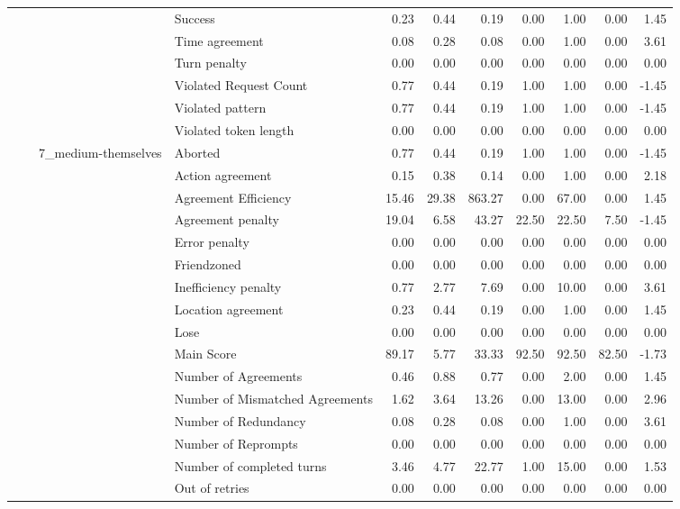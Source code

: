 \begin{tabular}{llllrrrrrrr}
 &  &  & Success & 0.23 & 0.44 & 0.19 & 0.00 & 1.00 & 0.00 & 1.45 \\
 &  &  & Time agreement & 0.08 & 0.28 & 0.08 & 0.00 & 1.00 & 0.00 & 3.61 \\
 &  &  & Turn penalty & 0.00 & 0.00 & 0.00 & 0.00 & 0.00 & 0.00 & 0.00 \\
 &  &  & Violated Request Count & 0.77 & 0.44 & 0.19 & 1.00 & 1.00 & 0.00 & -1.45 \\
 &  &  & Violated pattern & 0.77 & 0.44 & 0.19 & 1.00 & 1.00 & 0.00 & -1.45 \\
 &  &  & Violated token length & 0.00 & 0.00 & 0.00 & 0.00 & 0.00 & 0.00 & 0.00 \\
\cline{3-11}
 &  & \multirow[t]{27}{*}{7_medium-themselves} & Aborted & 0.77 & 0.44 & 0.19 & 1.00 & 1.00 & 0.00 & -1.45 \\
 &  &  & Action agreement & 0.15 & 0.38 & 0.14 & 0.00 & 1.00 & 0.00 & 2.18 \\
 &  &  & Agreement Efficiency & 15.46 & 29.38 & 863.27 & 0.00 & 67.00 & 0.00 & 1.45 \\
 &  &  & Agreement penalty & 19.04 & 6.58 & 43.27 & 22.50 & 22.50 & 7.50 & -1.45 \\
 &  &  & Error penalty & 0.00 & 0.00 & 0.00 & 0.00 & 0.00 & 0.00 & 0.00 \\
 &  &  & Friendzoned & 0.00 & 0.00 & 0.00 & 0.00 & 0.00 & 0.00 & 0.00 \\
 &  &  & Inefficiency penalty & 0.77 & 2.77 & 7.69 & 0.00 & 10.00 & 0.00 & 3.61 \\
 &  &  & Location agreement & 0.23 & 0.44 & 0.19 & 0.00 & 1.00 & 0.00 & 1.45 \\
 &  &  & Lose & 0.00 & 0.00 & 0.00 & 0.00 & 0.00 & 0.00 & 0.00 \\
 &  &  & Main Score & 89.17 & 5.77 & 33.33 & 92.50 & 92.50 & 82.50 & -1.73 \\
 &  &  & Number of Agreements & 0.46 & 0.88 & 0.77 & 0.00 & 2.00 & 0.00 & 1.45 \\
 &  &  & Number of Mismatched Agreements & 1.62 & 3.64 & 13.26 & 0.00 & 13.00 & 0.00 & 2.96 \\
 &  &  & Number of Redundancy & 0.08 & 0.28 & 0.08 & 0.00 & 1.00 & 0.00 & 3.61 \\
 &  &  & Number of Reprompts & 0.00 & 0.00 & 0.00 & 0.00 & 0.00 & 0.00 & 0.00 \\
 &  &  & Number of completed turns & 3.46 & 4.77 & 22.77 & 1.00 & 15.00 & 0.00 & 1.53 \\
 &  &  & Out of retries & 0.00 & 0.00 & 0.00 & 0.00 & 0.00 & 0.00 & 0.00 \\

\end{tabular}
